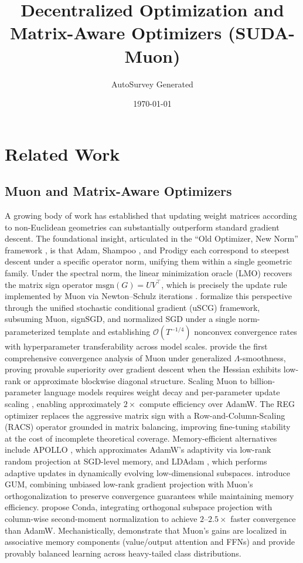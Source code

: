 \documentclass[11pt]{article}
\title{Decentralized Optimization and Matrix-Aware Optimizers (SUDA-Muon)}
\author{AutoSurvey Generated}
\date{\today}
\begin{document}
\maketitle

\section{Related Work}

\subsection{Muon and Matrix-Aware Optimizers}

A growing body of work has established that updating weight matrices according to non-Euclidean geometries can substantially outperform standard gradient descent. The foundational insight, articulated in the ``Old Optimizer, New Norm'' framework \citep{bernstein2024old}, is that Adam, Shampoo \citep{gupta2018shampoo}, and Prodigy each correspond to steepest descent under a specific operator norm, unifying them within a single geometric family. Under the spectral norm, the linear minimization oracle (LMO) recovers the matrix sign operator $\mathrm{msgn}(G) = UV^\top$, which is precisely the update rule implemented by Muon via Newton--Schulz iterations \citep{liu2025muon}. \citet{pethick2025training} formalize this perspective through the unified stochastic conditional gradient (uSCG) framework, subsuming Muon, signSGD, and normalized SGD under a single norm-parameterized template and establishing $\mathcal{O}(T^{-1/4})$ nonconvex convergence rates with hyperparameter transferability across model scales. \citet{shen2025convergence} provide the first comprehensive convergence analysis of Muon under generalized $\Lambda$-smoothness, proving provable superiority over gradient descent when the Hessian exhibits low-rank or approximate blockwise diagonal structure. Scaling Muon to billion-parameter language models requires weight decay and per-parameter update scaling \citep{liu2025muon}, enabling approximately $2\times$ compute efficiency over AdamW. The REG optimizer \citep{liu2025reg} replaces the aggressive matrix sign with a Row-and-Column-Scaling (RACS) operator grounded in matrix balancing, improving fine-tuning stability at the cost of incomplete theoretical coverage. Memory-efficient alternatives include APOLLO \citep{zhu2024apollo}, which approximates AdamW's adaptivity via low-rank random projection at SGD-level memory, and LDAdam \citep{Robert2024LDAdamAO}, which performs adaptive updates in dynamically evolving low-dimensional subspaces. \citet{pan2025unbiased} introduce GUM, combining unbiased low-rank gradient projection with Muon's orthogonalization to preserve convergence guarantees while maintaining memory efficiency. \citet{wang2025conda} propose Conda, integrating orthogonal subspace projection with column-wise second-moment normalization to achieve $2$--$2.5\times$ faster convergence than AdamW. Mechanistically, \citet{wang2025muon} demonstrate that Muon's gains are localized in associative memory components (value/output attention and FFNs) and provide provably balanced learning across heavy-tailed class distributions. \citet{abreu2025potential} 
\end{document}
